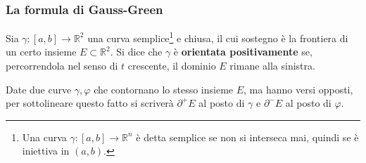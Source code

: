 \documentclass[10pt, a4paper]{scrartcl}
\theoremstyle{definition}
\numberwithin{esempio}{section}
\theoremstyle{definition}
\numberwithin{obs}{section}
\numberwithin{nota}{section}
\numberwithin{equation}{subsection}
\begin{document}
\subsubsection{La formula di Gauss-Green}
Sia $\gamma:\left[ a,b \right] \to \mathbb{R}^2$ una curva semplice\footnote{Una curva $\gamma:\left[ a,b \right] \to \mathbb{R}^n$ \`e detta semplice se non si interseca mai, quindi se \`e iniettiva in $(a,b)$.} e chiusa, il cui sostegno \`e la frontiera di un certo insieme $E \subset \mathbb{R}^2$.
Si dice che $\gamma$ \`e \textbf{orientata positivamente} se, percorrendola nel senso di $t$ crescente, il dominio $E$ rimane alla sinistra.

Date due curve $\gamma, \varphi $ che contornano lo stesso insieme $E$, ma hanno versi opposti, per sottolineare questo fatto si scriver\`a $\partial ^+E$ al posto di $\gamma$ e $\partial ^- E$ al posto di $\varphi $.
\end{document}
